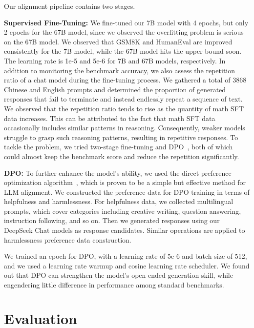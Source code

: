 Our alignment pipeline contains two stages. 

\textbf{Supervised Fine-Tuning: } We fine-tuned our 7B model with 4 epochs, but only 2 epochs for the 67B model, since we observed the overfitting problem is serious on the 67B model. We observed that GSM8K \citep{gsm8k} and HumanEval \citep{codex} are improved consistently for the 7B model, while the 67B model hits the upper bound soon. The learning rate is 1e-5 and 5e-6 for 7B and 67B models, respectively. In addition to monitoring the benchmark accuracy, we also assess the repetition ratio of a chat model during the fine-tuning process. We gathered a total of 3868 Chinese and English prompts and determined the proportion of generated responses that fail to terminate and instead endlessly repeat a sequence of text. We observed that the repetition ratio tends to rise as the quantity of math SFT data increases. This can be attributed to the fact that math SFT data occasionally includes similar patterns in reasoning. Consequently, weaker models struggle to grasp such reasoning patterns, resulting in repetitive responses. To tackle the problem, we tried two-stage fine-tuning and DPO~\citep{dpo}, both of which could almost keep the benchmark score and reduce the repetition significantly. 

\textbf{DPO: }To further enhance the model's ability, we used the direct preference optimization algorithm~\citep{dpo}, which is proven to be a simple but effective method for LLM alignment. We constructed the preference data for DPO training in terms of helpfulness and harmlessness. For helpfulness data, we collected multilingual prompts, which cover categories including creative writing, question answering, instruction following, and so on. Then we generated responses using our DeepSeek Chat models as response candidates. Similar operations are applied to harmlessness preference data construction.

We trained an epoch for DPO, with a learning rate of 5e-6 and batch size of 512, and we used a learning rate warmup and cosine learning rate scheduler. We found out that DPO can strengthen the model's open-ended generation skill, while engendering little difference in performance among standard benchmarks.

\section{Evaluation}

\label{sec:evluation}

